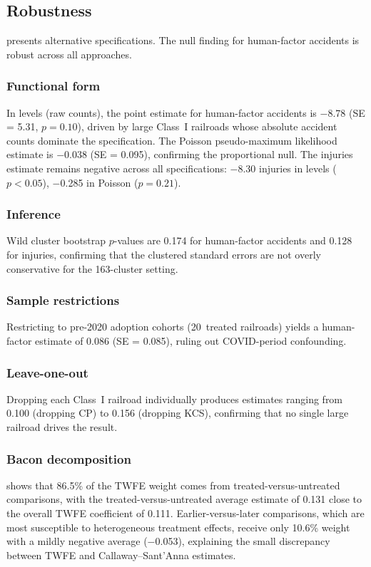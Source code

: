 \documentclass[12pt]{article}
\begin{document}


\subsection{Robustness}

 presents alternative specifications. The null finding for human-factor accidents is robust across all approaches.

\subsubsection*{Functional form} In levels (raw counts), the point estimate for human-factor accidents is $-$8.78 (SE = 5.31, $p = 0.10$), driven by large Class~I railroads whose absolute accident counts dominate the specification. The Poisson pseudo-maximum likelihood estimate is $-$0.038 (SE = 0.095), confirming the proportional null. The injuries estimate remains negative across all specifications: $-$8.30 injuries in levels ($p < 0.05$), $-$0.285 in Poisson ($p = 0.21$).

\subsubsection*{Inference} Wild cluster bootstrap $p$-values \citep{Cameron2008Bootstrap} are 0.174 for human-factor accidents and 0.128 for injuries, confirming that the clustered standard errors are not overly conservative for the 163-cluster setting.

\subsubsection*{Sample restrictions} Restricting to pre-2020 adoption cohorts (20~treated railroads) yields a human-factor estimate of 0.086 (SE = 0.085), ruling out COVID-period confounding.

\subsubsection*{Leave-one-out} Dropping each Class~I railroad individually produces estimates ranging from 0.100 (dropping CP) to 0.156 (dropping KCS), confirming that no single large railroad drives the result.

\subsubsection*{Bacon decomposition}  shows that 86.5\% of the TWFE weight comes from treated-versus-untreated comparisons, with the treated-versus-untreated average estimate of 0.131 close to the overall TWFE coefficient of 0.111. Earlier-versus-later comparisons, which are most susceptible to heterogeneous treatment effects, receive only 10.6\% weight with a mildly negative average ($-$0.053), explaining the small discrepancy between TWFE and Callaway--Sant'Anna estimates.
\end{document}
